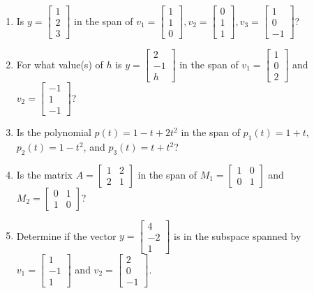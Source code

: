 \documentclass[11pt]{article}
\begin{document}
\begin{enumerate}[resume]
    \item Is $y = \begin{bmatrix} 1 \\ 2 \\ 3 \end{bmatrix}$ in the span of $v_1 = \begin{bmatrix} 1 \\ 1 \\ 0 \end{bmatrix}, v_2 = \begin{bmatrix} 0 \\ 1 \\ 1 \end{bmatrix}, v_3 = \begin{bmatrix} 1 \\ 0 \\ -1 \end{bmatrix}$?
    \item For what value(s) of $h$ is $y = \begin{bmatrix} 2 \\ -1 \\ h \end{bmatrix}$ in the span of $v_1 = \begin{bmatrix} 1 \\ 0 \\ 2 \end{bmatrix}$ and $v_2 = \begin{bmatrix} -1 \\ 1 \\ -1 \end{bmatrix}$?
    \item Is the polynomial $p(t) = 1 - t + 2t^2$ in the span of $p_1(t) = 1+t$, $p_2(t) = 1-t^2$, and $p_3(t) = t+t^2$?
    \item Is the matrix $A = \begin{bmatrix} 1 & 2 \\ 2 & 1 \end{bmatrix}$ in the span of $M_1 = \begin{bmatrix} 1 & 0 \\ 0 & 1 \end{bmatrix}$ and $M_2 = \begin{bmatrix} 0 & 1 \\ 1 & 0 \end{bmatrix}$?
    \item Determine if the vector $y = \begin{bmatrix} 4 \\ -2 \\ 1 \end{bmatrix}$ is in the subspace spanned by $v_1 = \begin{bmatrix} 1 \\ -1 \\ 1 \end{bmatrix}$ and $v_2 = \begin{bmatrix} 2 \\ 0 \\ -1 \end{bmatrix}$.
\end{enumerate}
\end{document}
